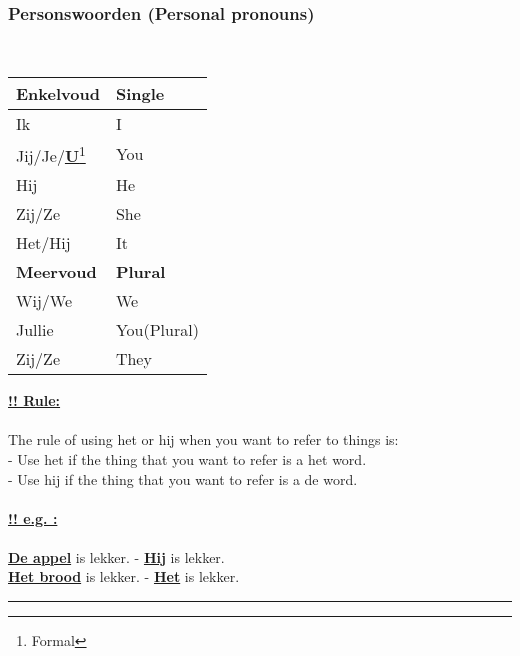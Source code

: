 \documentclass[a4paper,14pt]{extarticle}
\newcommand{\note}[2]{\underline{\textbf{#1}}\footnote{#2}}
\newcommand{\attention}[1]{\underline{\textbf{!! #1}}}
\newcommand{\emp}[1]{\underline{\textbf{#1}}}
\begin{document}
\subsubsection{Personswoorden (Personal pronouns)}
\begin{paracol}{2}
   \hfill \\
\begin{tabularx}{200pt}{ p{100pt} p{100pt} }
 \hline
 \textbf{Enkelvoud} & \textbf{Single} \\
 \hline
 Ik & I \\ 
 Jij/Je/\note{U}{Formal} & You \\  
 Hij & He \\ 
 Zij/Ze & She \\ 
 Het/Hij & It \\
 \hline
 \textbf{Meervoud} & \textbf{Plural}\\
 \hline
 Wij/We & We\\
 Jullie & You(Plural)\\
 Zij/Ze & They\\
\end{tabularx}
\switchcolumn
\attention{Rule:} \\ \\
The rule of using het or hij when you want to refer to things is: \\
- Use het if the thing that you want to refer is a het word. \\
- Use hij if the thing that you want to refer is a de word. \\ \\
\attention{e.g. :} \\ \\
\emp{De appel} is lekker. - \emp{Hij} is lekker. \\
\emp{Het brood} is lekker. - \emp{Het} is lekker.
\end{paracol}
\rule{\textwidth}{1pt}
\end{document}
